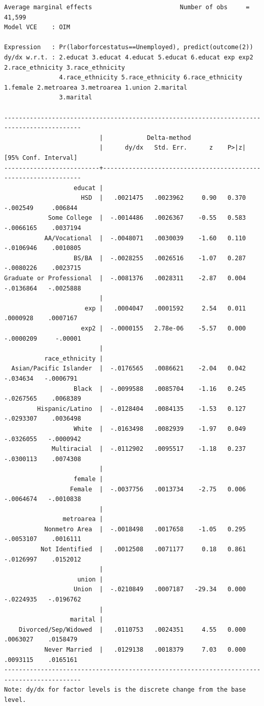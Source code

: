 \documentclass[
]{book}
\begin{document}
\begin{verbatim}
Average marginal effects                        Number of obs     =     41,599
Model VCE    : OIM

Expression   : Pr(laborforcestatus==Unemployed), predict(outcome(2))
dy/dx w.r.t. : 2.educat 3.educat 4.educat 5.educat 6.educat exp exp2 2.race_ethnicity 3.race_ethnicity
               4.race_ethnicity 5.race_ethnicity 6.race_ethnicity 1.female 2.metroarea 3.metroarea 1.union 2.marital
               3.marital

-------------------------------------------------------------------------------------------
                          |            Delta-method
                          |      dy/dx   Std. Err.      z    P>|z|     [95% Conf. Interval]
--------------------------+----------------------------------------------------------------
                   educat |
                     HSD  |   .0021475   .0023962     0.90   0.370     -.002549     .006844
            Some College  |  -.0014486   .0026367    -0.55   0.583    -.0066165    .0037194
           AA/Vocational  |  -.0048071   .0030039    -1.60   0.110    -.0106946    .0010805
                   BS/BA  |  -.0028255   .0026516    -1.07   0.287    -.0080226    .0023715
Graduate or Professional  |  -.0081376   .0028311    -2.87   0.004    -.0136864   -.0025888
                          |
                      exp |   .0004047   .0001592     2.54   0.011     .0000928    .0007167
                     exp2 |  -.0000155   2.78e-06    -5.57   0.000    -.0000209     -.00001
                          |
           race_ethnicity |
  Asian/Pacific Islander  |  -.0176565   .0086621    -2.04   0.042     -.034634   -.0006791
                   Black  |  -.0099588   .0085704    -1.16   0.245    -.0267565    .0068389
         Hispanic/Latino  |  -.0128404   .0084135    -1.53   0.127    -.0293307    .0036498
                   White  |  -.0163498   .0082939    -1.97   0.049    -.0326055   -.0000942
             Multiracial  |  -.0112902   .0095517    -1.18   0.237    -.0300113    .0074308
                          |
                   female |
                  Female  |  -.0037756   .0013734    -2.75   0.006    -.0064674   -.0010838
                          |
                metroarea |
           Nonmetro Area  |  -.0018498   .0017658    -1.05   0.295    -.0053107    .0016111
          Not Identified  |   .0012508   .0071177     0.18   0.861    -.0126997    .0152012
                          |
                    union |
                   Union  |  -.0210849   .0007187   -29.34   0.000    -.0224935   -.0196762
                          |
                  marital |
    Divorced/Sep/Widowed  |   .0110753   .0024351     4.55   0.000     .0063027    .0158479
           Never Married  |   .0129138   .0018379     7.03   0.000     .0093115    .0165161
-------------------------------------------------------------------------------------------
Note: dy/dx for factor levels is the discrete change from the base level.



\end{verbatim}
\end{document}
